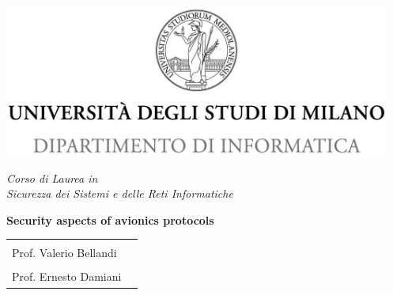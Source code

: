 \begin{titlepage}
  \begin{center}
    \includegraphics[height=5.0cm]{images/minerva_2013_DI.jpg}

    \vspace*{.4cm}
    {\Large
      \emph{Corso di Laurea in\\[.3cm]
         Sicurezza dei Sistemi e delle Reti Informatiche}
    }
    \vfill
    \begin{LARGE}
      \textbf{Security aspects of avionics protocols}
    \end{LARGE}

    \vfill
    \begin{minipage}{.99\linewidth}
      \begin{tabular}{l r}
        \begin{minipage}{.5\linewidth}
          \begin{flushleft}
            {\large
              RELATORE\\[.2cm]
              Prof. Valerio Bellandi\\[.6cm]
            }
            \vspace*{1.5cm}

            {\large
              CORRELATORE\\[.3cm]
              Prof. Ernesto Damiani
            }


\end{flushleft}
\end{minipage}
\end{tabular}
\end{minipage}
\end{center}
\end{titlepage}
